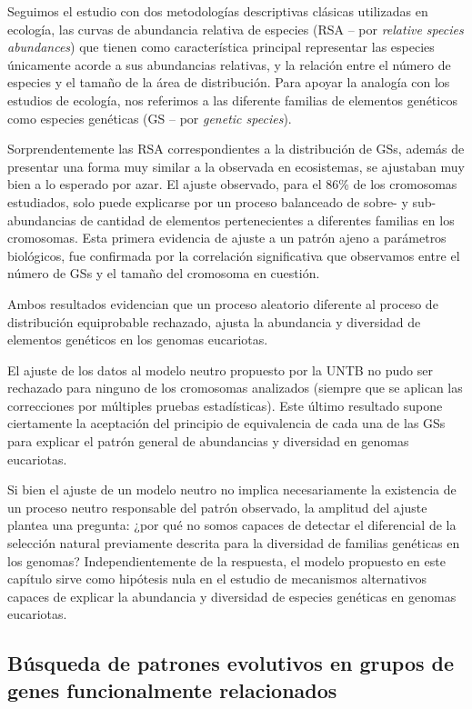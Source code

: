 Seguimos el estudio con dos metodologías descriptivas clásicas utilizadas en ecología, las curvas de abundancia relativa de especies (RSA -- por \textit{relative species abundances}) que tienen como característica principal representar las especies únicamente acorde a sus abundancias relativas, y la relación entre el número de especies y el tamaño de la área de distribución. Para apoyar la analogía con los estudios de ecología, nos referimos a las diferente familias de elementos genéticos como especies genéticas (GS -- por \textit{genetic species}).

Sorprendentemente las RSA correspondientes a la distribución de GSs, además de presentar una forma muy similar a la observada en ecosistemas, se ajustaban muy bien a lo esperado por azar. El ajuste observado, para el 86\% de los cromosomas estudiados, solo puede explicarse por un proceso balanceado de sobre- y sub-abundancias de cantidad de elementos pertenecientes a diferentes familias en los cromosomas. Esta primera evidencia de ajuste a un patrón ajeno a parámetros biológicos, fue confirmada por la correlación significativa que observamos entre el número de GSs y el tamaño del cromosoma en cuestión.

Ambos resultados evidencian que un proceso aleatorio diferente al proceso de distribución equiprobable rechazado, ajusta la abundancia y diversidad de elementos genéticos en los genomas eucariotas.

El ajuste de los datos al modelo neutro propuesto por la UNTB no pudo ser rechazado para ninguno de los cromosomas analizados (siempre que se aplican las correcciones por múltiples pruebas estadísticas). Este último resultado supone ciertamente la aceptación del principio de equivalencia de cada una de las GSs para explicar el patrón general de abundancias y diversidad en genomas eucariotas.

Si bien el ajuste de un modelo neutro no implica necesariamente la existencia de un proceso neutro responsable del patrón observado, la amplitud del ajuste plantea una pregunta: ¿por qué no somos capaces de detectar el diferencial de la selección natural previamente descrita para la diversidad de familias genéticas en los genomas? Independientemente de la respuesta, el modelo propuesto en este capítulo sirve como hipótesis nula en el estudio de mecanismos alternativos capaces de explicar la abundancia y diversidad de especies genéticas en genomas eucariotas.

\subsection*{Búsqueda de patrones evolutivos en grupos de genes funcionalmente relacionados}

